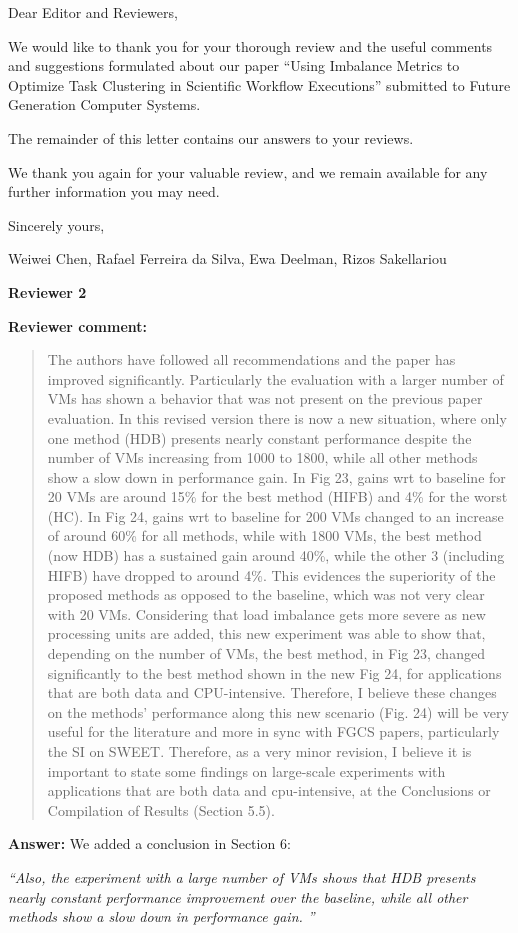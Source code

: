 \documentclass{letter}
\date{Sep 1, 2014}
\newenvironment{review}%
{\textbf{Reviewer comment:}\begin{quote}}%
{\end{quote}}%
\newcommand{\answer}[1]{%
      \textbf{Answer:} #1}
\newcommand{\revised}[1]{\emph{#1}\color{black}}
\begin{document}
\begin{letter}{}

\opening{Dear Editor and Reviewers,}

We would like to thank you for your thorough review and the useful
comments and suggestions formulated about our paper ``Using Imbalance Metrics to Optimize Task Clustering in Scientific Workflow Executions'' submitted to
Future Generation Computer Systems.

The remainder of this letter contains our answers to your reviews. 

We thank you again for your valuable review, and we remain available for any further information you may need.

\vspace{0.5cm}

Sincerely yours,

\vspace{1cm}

Weiwei Chen, Rafael Ferreira da Silva, Ewa Deelman, Rizos Sakellariou

\newpage

\textbf{Reviewer 2}


\begin{review}
The authors have followed all recommendations and the paper has improved significantly. Particularly the evaluation with a larger number of VMs has shown a behavior that was not present on the previous paper evaluation. In this revised version there is now a new situation, where only one method (HDB) presents nearly constant performance despite the number of VMs increasing from 1000 to 1800, while all other methods show a slow down in performance gain. In Fig 23, gains wrt to baseline for 20 VMs are around 15\% for the best method (HIFB) and 4\% for the worst (HC). In Fig 24, gains wrt to baseline for 200 VMs changed to an increase of around 60\% for all methods, while with 1800 VMs, the best method (now HDB) has a sustained gain around 40\%, while the other 3 (including HIFB) have dropped to around 4\%. This evidences the superiority of the proposed methods as opposed to the baseline, which was not very clear with 20 VMs. Considering that load imbalance gets more
severe as new processing units are added, this new experiment was able to show that, depending on the number of VMs, the best method, in Fig 23, changed significantly to the best method shown in the new Fig 24, for applications that are both data and CPU-intensive. Therefore, I believe these changes on the methods' performance along this new scenario (Fig. 24) will be very useful for the literature and more in sync with FGCS papers, particularly the SI on SWEET.
Therefore, as a very minor revision, I believe it is important to state some findings on large-scale experiments with applications that are both data and cpu-intensive, at the Conclusions or Compilation of Results (Section 5.5).\end{review}

\answer{We added a conclusion in Section 6:}

\revised{``Also, the experiment with a large number of VMs shows that HDB presents nearly constant performance improvement over the baseline, while all other methods show a slow down in performance gain. ''}



\end{letter}
\end{document}
